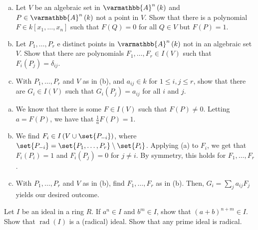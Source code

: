 \documentclass[10pt]{mypackage}
\renewcommand*{\mathbb}[1]{\varmathbb{#1}}
\newcommand{\A}{\mathbb{A}}
\begin{document}
\begin{exercise}[Exercise 1.17]\hfill
\begin{enumerate}[(a)]
  \item Let $V$ be an algebraic set in $\A^n\left(k\right)$ and $P\in \A^n\left(k\right)$ not a point in $V$. Show that there is a polynomial $F\in k\left[x_1,\dots,x_n\right]$ such that $F(Q) = 0$ for all $Q\in V$ but $F(P) = 1$.
  \item Let $P_1,\dots,P_r$ e distinct points in $\A^n\left(k\right)$ not in an algebraic set $V$. Show that there are polynomials $F_1,\dots,F_r\in I(V)$ such that $F_i\left(P_j\right) = \delta_{ij}$.
  \item With $P_1,\dots,P_r$ and $V$ as in (b), and $a_{ij}\in k$ for $1\leq i,j\leq r$, show that there are $G_i\in I(V)$ such that $G_i\left(P_j\right) = a_{ij}$ for all $i$ and $j$.
\end{enumerate}
\end{exercise}
\begin{solution}\hfill
  \begin{enumerate}[(a)]
    \item We know that there is some $F\in I(V)$ such that $F(P)\neq 0$. Letting $a = F(P)$, we have that $\frac{1}{a}F(P) = 1$.
    \item We find $F_i\in I\left(V \cup \set{P_{-i}}\right)$, where $\set{P_{-i}} = \set{P_1,\dots,P_r}\setminus\set{P_i}$. Applying (a) to $F_i$, we get that $F_i\left(P_i\right) = 1$ and $F_i\left(P_{j}\right) = 0$ for $j\neq i$. By symmetry, this holds for $F_1,\dots,F_r$.
    \item With $P_1,\dots,P_r$ and $V$ as in (b), find $F_1,\dots,F_r$ as in (b). Then, $G_i = \sum_{j}a_{ij}F_j$ yields our desired outcome.
  \end{enumerate}
\end{solution}
\begin{exercise}[Exercise 1.18]
  Let $I$ be an ideal in a ring $R$. If $a^n\in I$ and $b^m\in I$, show that $\left(a+b\right)^{n+m}\in I$. Show that $\operatorname{rad}\left(I\right)$ is a (radical) ideal. Show that any prime ideal is radical.
\end{exercise}
\end{document}
